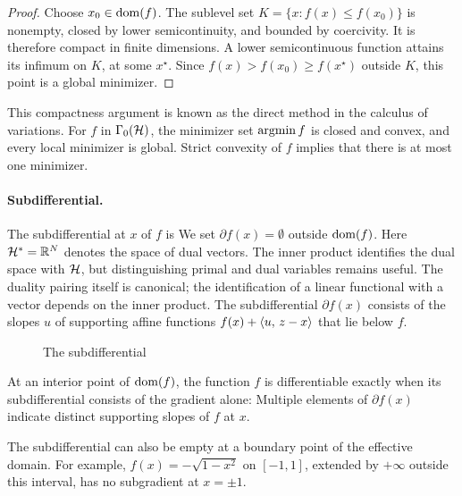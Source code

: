 \begin{proof}
Choose $x_0\in\operatorname{dom}(f)$. The sublevel set $K=\{x:f(x)\leq f(x_0)\}$ is nonempty, closed by lower semicontinuity, and bounded by coercivity. It is therefore compact in finite dimensions. A lower semicontinuous function attains its infimum on $K$, at some $x^\star$. Since $f(x)>f(x_0)\geq f(x^\star)$ outside $K$, this point is a global minimizer.
\end{proof}

This compactness argument is known as the direct method in the calculus of variations.
%
For $f$ in $\Gamma_0(\mathcal{H})$, the minimizer set $\operatorname{argmin} f$ is closed and convex, and every local minimizer is global. Strict convexity of $f$ implies that there is at most one minimizer.

\paragraph{Subdifferential.}

The subdifferential at $x$ of $f$ is
We set $\partial f(x)=\emptyset$ outside $\operatorname{dom}(f)$. Here $\mathcal{H}^*=\mathbb{R}^N$ denotes the space of dual vectors. The inner product identifies the dual space with $\mathcal{H}$, but distinguishing primal and dual variables remains useful. The duality pairing itself is canonical; the identification of a linear functional with a vector depends on the inner product.
%
The subdifferential $\partial f(x)$ consists of the slopes $u$ of supporting affine functions $f(x) + \langle u,\,z-x\rangle$ that lie below $f$.


\begin{figure}[tbp]
\centering
{}
\caption{The subdifferential}
\label{fig-review-convex-analysis-subdifferential}
\end{figure}
At an interior point of $\operatorname{dom}(f)$, the function $f$ is differentiable exactly when its subdifferential consists of the gradient alone:
Multiple elements of $\partial f(x)$ indicate distinct supporting slopes of $f$ at $x$.

The subdifferential can also be empty at a boundary point of the effective domain. For example, $f(x)=-\sqrt{1-x^2}$ on $[-1,1]$, extended by $+\infty$ outside this interval, has no subgradient at $x=\pm1$.

